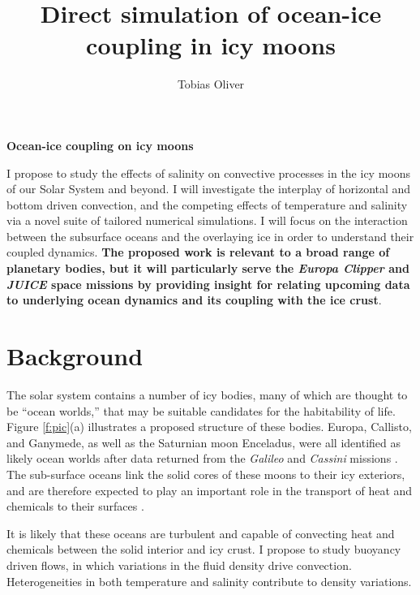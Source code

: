 \documentclass[12pt]{article}
\title{Direct simulation of ocean-ice coupling in icy moons}
\author{Tobias Oliver}
\date{}
\begin{document}
\pagestyle{fancy}
\thispagestyle{fancy}
\fancyhf{} %
\fancyhead[L]{\textcolor{red}{Tobias Oliver\\
Research Proposal}}
\fancyfoot[R]{\thepage}
\newcommand{\citep}[1]{\cite{#1}}
\begin{center}
\large{\textbf{Ocean-ice coupling on icy moons}}
\end{center}

I propose to study the effects of salinity on convective processes in the icy moons of our Solar System and beyond. 
I will investigate the interplay of horizontal and bottom driven convection, and the competing effects of temperature and salinity via a novel suite of tailored numerical simulations. 
I will focus on the interaction between the subsurface oceans and the overlaying ice in order to understand their coupled dynamics. 
\textbf{The proposed work is relevant to a broad range of planetary bodies, but it will particularly serve the \textit{Europa Clipper} and \textit{JUICE} space missions by providing insight for relating upcoming data to underlying ocean dynamics and its coupling with the ice crust}.

\section{Background}
The solar system contains a number of icy bodies, many of which are thought to be ``ocean worlds,'' that may be suitable candidates for the habitability of life.
Figure \ref{f:pic}(a) illustrates a proposed structure of these bodies. 
Europa, Callisto, and Ganymede, as well as the Saturnian moon Enceladus, were all identified as likely ocean worlds after data returned from the \textit{Galileo} and \textit{Cassini} missions \citep{fN16}.
The sub-surface oceans link the solid cores of these moons to their icy exteriors, and are therefore expected to play an important role in the transport of heat and chemicals to their surfaces \citep{kS20}. 

It is likely that these oceans are turbulent and capable of convecting heat and chemicals between the solid interior and icy crust.
I propose to study buoyancy driven flows, in which variations in the fluid density drive convection.
Heterogeneities in both temperature and salinity contribute to density variations.
\end{document}
